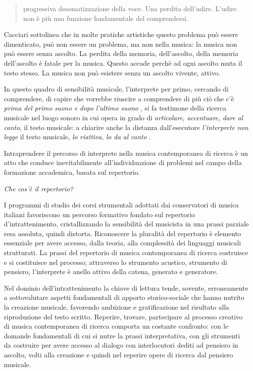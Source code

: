 \documentclass{gs-adonis}
\begin{document}
\begin{quote}
progressiva desomatizzazione della voce. Una perdita dell'udire. L'udire
non è più una funzione fondamentale del comprendersi. \cite{Cacciari1995}
\end{quote}

Cacciari sottolinea che in molte pratiche artistiche questo problema può essere
dimenticato, può non essere un problema, ma non nella musica: la musica non può
essere senza ascolto. La perdita della memoria, dell'ascolto, della memoria
dell'ascolto è fatale per la musica. Questo accade perchè ad ogni ascolto muta
il testo stesso. La musica non può esistere senza un ascolto vivente, attivo.

In questo quadro di sensibilità musicale, l'interprete per primo, cercando di
comprendere, di capire che vorrebbe riuscire a comprendere di più ciò che c'è
\emph{prima del primo suono e dopo l'ultimo suono} \cite{Cacciari1995}, si fa
testimone della ricerca musicale nel luogo sonoro in cui opera in grado di
\emph{articolare, accentuare, dare al canto}, il testo musicale: a chiarire
anche la distanza dall'esecutore \emph{l'interprete non legge} il testo
musicale, \emph{lo riattiva, lo da al canto} \cite{Cacciari1995}.

Intraprendere il percorso di interprete nella musica contemporanea di ricerca è
un atto che conduce inevitabilmente all'individuazione di problemi nel campo
della formazione accademica, basata sul repertorio.

\emph{Che cos'è il repertorio?}

I programmi di studio dei corsi strumentali adottati dai conservatori di musica italiani favoriscono un percorso formativo
fondato sul repertorio d'intrattenimento, cristallizzando la sensibilità del musicista in una prassi parziale resa assoluta,
quindi distorta.
Riconoscere la pluralità del repertorio è elemento essenziale per avere accesso, dalla teoria,
alla complessità dei linguaggi musicali strutturati.
La prassi del repertorio di musica contemporanea di ricerca costruisce e si costituisce nel processo;
attraverso lo strumento acustico, strumento di pensiero, l'interprete è anello attivo della catena, generato e generatore.

Nel dominio dell'intrattenimento la chiave di lettura tende, sovente, erroneamente a sottovalutare aspetti fondamentali di apporto storico-sociale
che hanno nutrito la creazione musicale, favorendo ambizione e gratificazione nel risultato alla riproduzione del testo scritto.
Reperire, trovare, partecipare al processo creativo di musica contemporanea di ricerca comporta un costante confronto:
con le domande fondamentali di cui si nutre la prassi interpretativa, con gli strumenti da costruire per avere accesso al dialogo con
interlocutori dediti ad pensiero in ascolto, volti alla creazione e quindi nel reperire opere di ricerca dal pensiero musicale.
\end{document}
